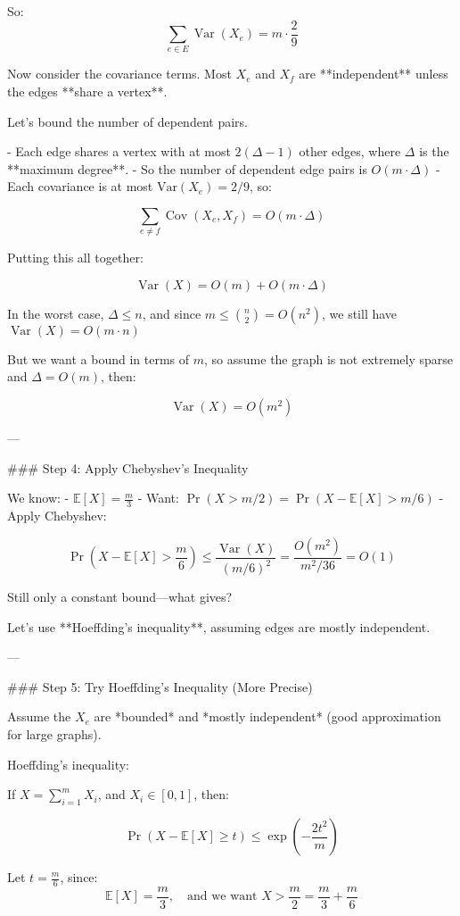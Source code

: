 So:
\[
\sum_{e \in E} \operatorname{Var}(X_e) = m \cdot \frac{2}{9}
\]

Now consider the covariance terms. Most \( X_e \) and \( X_f \) are **independent** unless the edges **share a vertex**.

Let's bound the number of dependent pairs.

- Each edge shares a vertex with at most \( 2(\Delta - 1) \) other edges, where \( \Delta \) is the **maximum degree**.
- So the number of dependent edge pairs is \( O(m \cdot \Delta) \)
- Each covariance is at most \( \text{Var}(X_e) = 2/9 \), so:

\[
\sum_{e \ne f} \operatorname{Cov}(X_e, X_f) = O(m \cdot \Delta)
\]

Putting this all together:

\[
\operatorname{Var}(X) = O(m) + O(m \cdot \Delta)
\]

In the worst case, \( \Delta \le n \), and since \( m \le \binom{n}{2} = O(n^2) \), we still have \( \operatorname{Var}(X) = O(m \cdot n) \)

But we want a bound in terms of \( m \), so assume the graph is not extremely sparse and \( \Delta = O(m) \), then:

\[
\operatorname{Var}(X) = O(m^2)
\]

---

### Step 4: Apply Chebyshev's Inequality

We know:
- \( \mathbb{E}[X] = \frac{m}{3} \)
- Want: \( \Pr(X > m/2) = \Pr\left(X - \mathbb{E}[X] > m/6\right) \)
- Apply Chebyshev:

\[
\Pr\left(X - \mathbb{E}[X] > \frac{m}{6} \right) \le \frac{\operatorname{Var}(X)}{(m/6)^2} = \frac{O(m^2)}{m^2/36} = O(1)
\]

Still only a constant bound—what gives?

Let's use **Hoeffding's inequality**, assuming edges are mostly independent.

---

### Step 5: Try Hoeffding's Inequality (More Precise)

Assume the \( X_e \) are *bounded* and *mostly independent* (good approximation for large graphs).

Hoeffding's inequality:

If \( X = \sum_{i=1}^m X_i \), and \( X_i \in [0,1] \), then:

\[
\Pr(X - \mathbb{E}[X] \ge t) \le \exp\left(-\frac{2t^2}{m}\right)
\]

Let \( t = \frac{m}{6} \), since:
\[
\mathbb{E}[X] = \frac{m}{3}, \quad \text{and we want } X > \frac{m}{2} = \frac{m}{3} + \frac{m}{6}
\]

